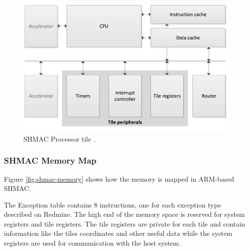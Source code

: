 \begin{figure}[htb]
    \centering
    \includegraphics[width=1.0\textwidth]{Figures/Heterogeneous/SHMACCPU}
    \caption{SHMAC Processor tile \cite{shmac-plan}.}
    \label{fig:shmac-cpu}
\end{figure}


\subsubsection{SHMAC Memory Map}

Figure \ref{fig:shmac-memory} shows how the memory is mapped in ARM-based SHMAC.

The Exception table contains 8 instructions, one for each exception type described on Redmine.
The high end of the memory space is reserved for system registers and tile registers. 
The tile registers are private for each tile and contain information like the tiles coordinates and other useful data while the system registers are used for communication with the host system.


